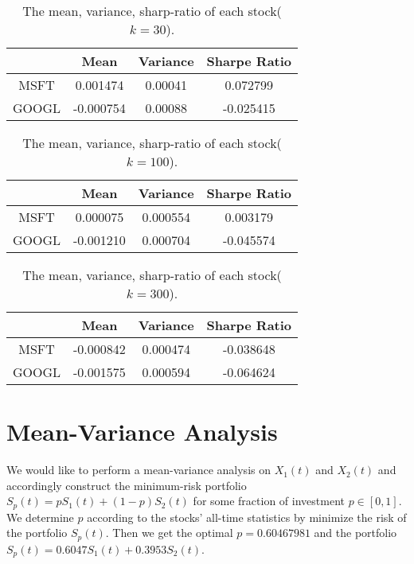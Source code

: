 \documentclass[runningheads]{llncs}
\begin{document}
\begin{table}
    \centering
    \caption{The mean, variance, sharp-ratio of each stock($k=30$).}
    \label{tab:stats2}
    \begin{tabularx}{\textwidth}{|C|C|C|C|}
        \hline
              & Mean      & Variance & Sharpe Ratio \\
        \hline
        MSFT  & 0.001474  & 0.00041  & 0.072799     \\
        GOOGL & -0.000754 & 0.00088  & -0.025415    \\
        \hline
    \end{tabularx}
\end{table}
\begin{table}
    \centering
    \caption{The mean, variance, sharp-ratio of each stock($k=100$).}
    \label{tab:stats3}
    \begin{tabularx}{\textwidth}{|C|C|C|C|}
        \hline
              & Mean      & Variance & Sharpe Ratio \\
        \hline
        MSFT  & 0.000075  & 0.000554 & 0.003179     \\
        GOOGL & -0.001210 & 0.000704 & -0.045574    \\
        \hline
    \end{tabularx}
\end{table}
\begin{table}
    \centering
    \caption{The mean, variance, sharp-ratio of each stock($k=300$).}
    \label{tab:stats4}
    \begin{tabularx}{\textwidth}{|C|C|C|C|}
        \hline
              & Mean      & Variance & Sharpe Ratio \\
        \hline
        MSFT  & -0.000842 & 0.000474 & -0.038648    \\
        GOOGL & -0.001575 & 0.000594 & -0.064624    \\
        \hline
    \end{tabularx}
\end{table}

\section{Mean-Variance Analysis}

We would like to perform a mean-variance analysis on $X_1(t)$ and $X_2(t)$ and
accordingly construct the minimum-risk portfolio $S_p(t) = pS_1(t)+(1-p)S_2(t)$  for some fraction of investment $p\in[0, 1]$.
We determine $p$ according to the stocks' all-time statistics by minimize the risk of the portfolio $S_p(t)$.
Then we get the optimal $p=0.60467981$ and the portfolio $S_p(t)=0.6047S_1(t)+0.3953S_2(t)$.
\end{document}
